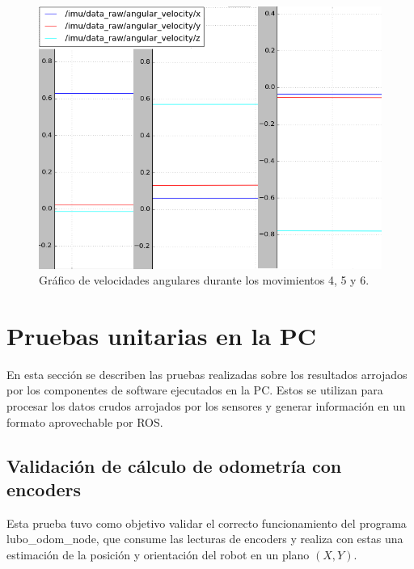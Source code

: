 \begin{figure}[ht]
    \centering
    \includegraphics[scale=0.42]{./Figures/angular_velocity_2.png}
    \caption{Gráfico de velocidades angulares durante los movimientos 4, 5 y 6.}
    \label{fig:velocidadAngular2}
\end{figure}


\section{Pruebas unitarias en la PC}

En esta sección se describen las pruebas realizadas sobre los resultados arrojados por los componentes de software ejecutados en la PC. Estos se utilizan para procesar los datos crudos arrojados por los sensores y generar información en un formato aprovechable por ROS.

\subsection{Validación de cálculo de odometría con encoders}

Esta prueba tuvo como objetivo validar el correcto funcionamiento del programa lubo\_odom\_node, que consume las lecturas de encoders y realiza con estas una estimación de la posición y orientación del robot en un plano $(X,Y)$.

